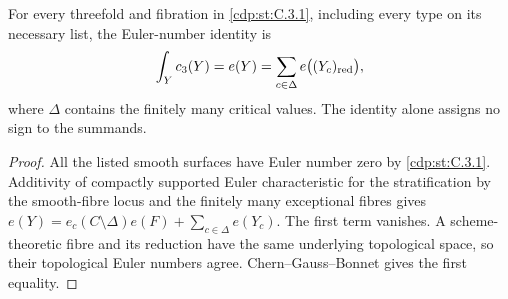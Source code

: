 
\begin{proposition}\label{cdp:st:C.3.5}
For every threefold and fibration in \ref{cdp:st:C.3.1}, including every type on
its necessary list, the Euler-number identity is
\[
\int_Y c_3(Y)=e(Y)=\sum_{c\in\Delta}e\bigl((Y_c)_{\rm red}\bigr),
\]
where $\Delta$ contains the finitely many critical values.
The identity alone assigns no sign to the summands.
\end{proposition}
\begin{proof}
All the listed smooth surfaces have Euler number zero by \ref{cdp:st:C.3.1}.
Additivity of compactly supported Euler characteristic for the
stratification by the smooth-fibre locus and the finitely many
exceptional fibres gives
$e(Y)=e_c(C\setminus\Delta)e(F)+\sum_{c\in\Delta}e(Y_c)$.
The first term vanishes. A scheme-theoretic fibre and its reduction
have the same underlying topological space, so their topological
Euler numbers agree. Chern--Gauss--Bonnet gives the first equality.
\end{proof}


